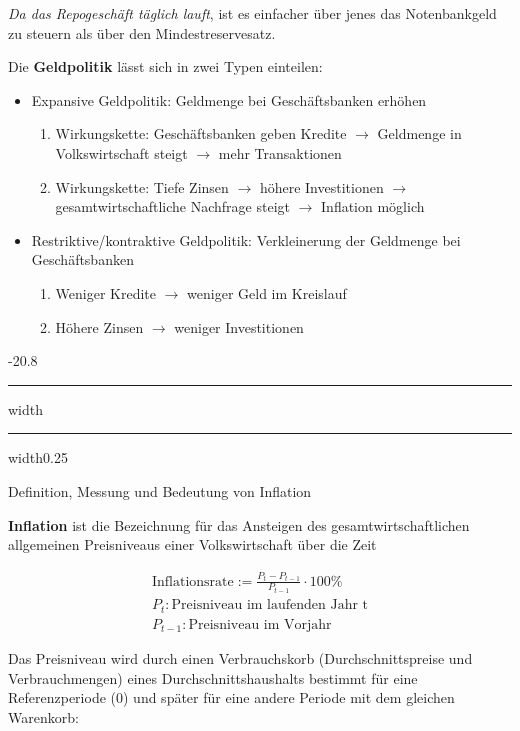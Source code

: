 \documentclass[9pt, landscape, fleqn]{scrartcl}
\makeatletter
\renewcommand{\subsection}{\@startsection{subsection}{1}{0mm}%
{-2\baselineskip}{0.8\baselineskip}%
{\hrule depth 0.2pt width\columnwidth\hrule depth0.75pt
width0.25\columnwidth\vspace*{1.2em}\large\bfseries\rmfamily}}
\makeatother
\begin{document}
\begin{multicols*}{3}
\emph{Da das Repogeschäft täglich lauft}, ist es einfacher über jenes das Notenbankgeld zu steuern als über den Mindestreservesatz. \newline

Die \textbf{Geldpolitik} lässt sich in zwei Typen einteilen:

\begin{itemize}
    \item Expansive Geldpolitik: Geldmenge bei Geschäftsbanken erhöhen 
    \begin{enumerate}
        \item Wirkungskette: Geschäftsbanken geben Kredite $\rightarrow$ Geldmenge in Volkswirtschaft steigt $\rightarrow$ mehr Transaktionen 
        \item Wirkungskette: Tiefe Zinsen $\rightarrow$ höhere Investitionen $\rightarrow$ gesamtwirtschaftliche Nachfrage steigt $\rightarrow$ Inflation möglich
    \end{enumerate}
    \item Restriktive/kontraktive Geldpolitik: Verkleinerung der Geldmenge bei Geschäftsbanken 
    \begin{enumerate}
        \item Weniger Kredite $\rightarrow$ weniger Geld im Kreislauf 
        \item Höhere Zinsen $\rightarrow$ weniger Investitionen 
    \end{enumerate}
\end{itemize}

\subsection{Definition, Messung und Bedeutung von Inflation}

\textbf{Inflation} ist die Bezeichnung für das Ansteigen des gesamtwirtschaftlichen allgemeinen Preisniveaus einer Volkswirtschaft über die Zeit

\begin{align}
    \text{Inflationsrate} := \frac{P_t - P_{t-1}}{P_{t-1}}\cdot 100\% \\
    P_t: \text{Preisniveau im laufenden Jahr t} \\
    P_{t-1}: \text{Preisniveau im Vorjahr}
\end{align}

Das Preisniveau wird durch einen Verbrauchskorb (Durchschnittspreise und Verbrauchmengen) eines Durchschnittshaushalts bestimmt für eine Referenzperiode (0) und später für eine andere Periode mit dem gleichen Warenkorb: 


\end{multicols*}
\end{document}
